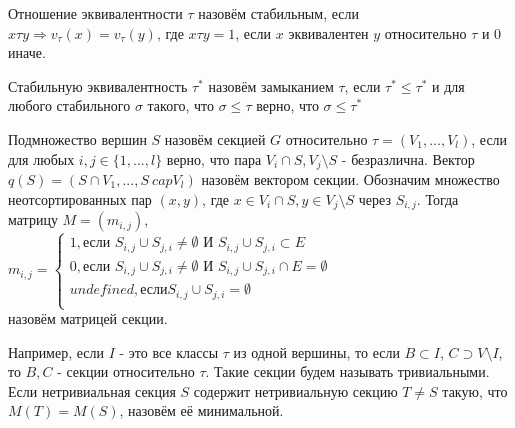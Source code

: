 \begin{definition}
    Отношение эквивалентности $\tau$ назовём стабильным, если $x \tau y \Rightarrow v_{\tau}(x) = v_{\tau}(y)$, где $x \tau y = 1$, если $x$ эквивалентен $y$ относительно $\tau$ и 0 иначе.
\end{definition}

\begin{definition}
    Стабильную эквивалентность $\tau^*$ назовём замыканием $\tau$, если  $\tau^* \leqslant \tau^*$ и для любого стабильного $\sigma$ такого, что $\sigma \leqslant \tau$ верно, что $\sigma \leqslant \tau^*$
\end{definition}

\begin{definition}
    Подмножество вершин $S$ назовём секцией $G$ относительно $\tau = (V_1, ..., V_l)$, если для любых $i, j \in \{1, ..., l\}$ верно, что пара $V_i \cap S, V_j \text{\textbackslash} S$ - безразлична. Вектор $q(S)=(S \cap V_1, ..., S \ cap V_l)$ назовём вектором секции. Обозначим множество неотсортированных пар $(x, y)$, где $x \in V_i \cap S, y \in V_j \text{\textbackslash} S$ через $S_{i, j}$. Тогда матрицу $M = (m_{i, j})$,\\ 
    $m_{i, j} = 
    \begin{cases}
        1, \text{если } S_{i, j} \cup S_{j, i} \neq \emptyset \text{ И } S_{i, j} \cup S_{j, i} \subset E\\
        0, \text{если } S_{i, j} \cup S_{j, i} \neq \emptyset \text{ И } S_{i, j} \cup S_{j, i} \cap E = \emptyset\\
        undefined,  \text{если} S_{i, j} \cup S_{j, i} = \emptyset\\
    \end{cases}$\\
    назовём матрицей секции. 
\end{definition}

Например, если $I$ - это все классы $\tau$ из одной вершины, то если $B \subset I$, $C \supset  V \text{\textbackslash} I$, то $B, C$ - секции относительно $\tau$. Такие секции будем называть тривиальными. Если нетривиальная секция $S$ содержит нетривиальную секцию $T \neq S$ такую, что $M(T) = M(S)$, назовём её минимальной.

